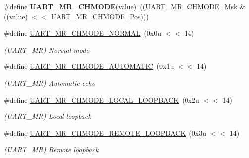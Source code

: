 \begin{DoxyCompactItemize}
\mbox{\label{group__SAME70__UART_gab5b8bfa6c86afa2918bdc585823ae86f}} 
\#define {\bfseries U\+A\+R\+T\+\_\+\+M\+R\+\_\+\+C\+H\+M\+O\+DE}(value)~((\mbox{\hyperlink{group__SAMV71__UART_gaae4c24ca9b88ad0fcc45c6525705d23c}{U\+A\+R\+T\+\_\+\+M\+R\+\_\+\+C\+H\+M\+O\+D\+E\+\_\+\+Msk}} \& ((value) $<$$<$ U\+A\+R\+T\+\_\+\+M\+R\+\_\+\+C\+H\+M\+O\+D\+E\+\_\+\+Pos)))
\item 
\mbox{\label{group__SAME70__UART_ga2761793c6a7ac89444965deb9147b9c7}} 
\#define \mbox{\hyperlink{group__SAME70__UART_ga2761793c6a7ac89444965deb9147b9c7}{U\+A\+R\+T\+\_\+\+M\+R\+\_\+\+C\+H\+M\+O\+D\+E\+\_\+\+N\+O\+R\+M\+AL}}~(0x0u $<$$<$ 14)
\begin{DoxyCompactList}\small\item\em (U\+A\+R\+T\+\_\+\+MR) Normal mode \end{DoxyCompactList}\item 
\mbox{\label{group__SAME70__UART_ga3e7e86c1dbd250fe7a0edd0a0bf712d1}} 
\#define \mbox{\hyperlink{group__SAME70__UART_ga3e7e86c1dbd250fe7a0edd0a0bf712d1}{U\+A\+R\+T\+\_\+\+M\+R\+\_\+\+C\+H\+M\+O\+D\+E\+\_\+\+A\+U\+T\+O\+M\+A\+T\+IC}}~(0x1u $<$$<$ 14)
\begin{DoxyCompactList}\small\item\em (U\+A\+R\+T\+\_\+\+MR) Automatic echo \end{DoxyCompactList}\item 
\mbox{\label{group__SAME70__UART_gaccdee7be5b1c4193e9b5db7a4470af3d}} 
\#define \mbox{\hyperlink{group__SAME70__UART_gaccdee7be5b1c4193e9b5db7a4470af3d}{U\+A\+R\+T\+\_\+\+M\+R\+\_\+\+C\+H\+M\+O\+D\+E\+\_\+\+L\+O\+C\+A\+L\+\_\+\+L\+O\+O\+P\+B\+A\+CK}}~(0x2u $<$$<$ 14)
\begin{DoxyCompactList}\small\item\em (U\+A\+R\+T\+\_\+\+MR) Local loopback \end{DoxyCompactList}\item 
\mbox{\label{group__SAME70__UART_ga8418adfee235ea37e74a0d9222724c13}} 
\#define \mbox{\hyperlink{group__SAME70__UART_ga8418adfee235ea37e74a0d9222724c13}{U\+A\+R\+T\+\_\+\+M\+R\+\_\+\+C\+H\+M\+O\+D\+E\+\_\+\+R\+E\+M\+O\+T\+E\+\_\+\+L\+O\+O\+P\+B\+A\+CK}}~(0x3u $<$$<$ 14)
\begin{DoxyCompactList}\small\item\em (U\+A\+R\+T\+\_\+\+MR) Remote loopback \end{DoxyCompactList}\item 
$$
\end{DoxyCompactItemize}
